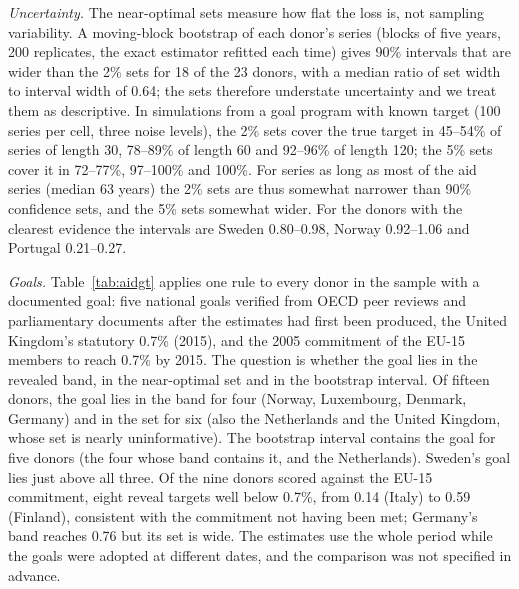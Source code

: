 \documentclass[11pt,a4paper]{article}
\theoremstyle{remark}\newtheorem{remark}{Remark}
\begin{document}
\emph{Uncertainty.} The near-optimal sets measure how flat the loss is, not sampling variability. A moving-block bootstrap of each donor's series (blocks of five years, 200 replicates, the exact estimator refitted each time) gives 90\% intervals that are wider than the 2\% sets for 18 of the 23 donors, with a median ratio of set width to interval width of 0.64; the sets therefore understate uncertainty and we treat them as descriptive. In simulations from a goal program with known target (100 series per cell, three noise levels), the 2\% sets cover the true target in 45--54\% of series of length 30, 78--89\% of length 60 and 92--96\% of length 120; the 5\% sets cover it in 72--77\%, 97--100\% and 100\%. For series as long as most of the aid series (median 63 years) the 2\% sets are thus somewhat narrower than 90\% confidence sets, and the 5\% sets somewhat wider. For the donors with the clearest evidence the intervals are Sweden 0.80--0.98, Norway 0.92--1.06 and Portugal 0.21--0.27.

\emph{Goals.} Table~\ref{tab:aidgt} applies one rule to every donor in the sample with a documented goal: five national goals verified from OECD peer reviews and parliamentary documents after the estimates had first been produced, the United Kingdom's statutory 0.7\% (2015), and the 2005 commitment of the EU-15 members to reach 0.7\% by 2015. The question is whether the goal lies in the revealed band, in the near-optimal set and in the bootstrap interval. Of fifteen donors, the goal lies in the band for four (Norway, Luxembourg, Denmark, Germany) and in the set for six (also the Netherlands and the United Kingdom, whose set is nearly uninformative). The bootstrap interval contains the goal for five donors (the four whose band contains it, and the Netherlands). Sweden's goal lies just above all three. Of the nine donors scored against the EU-15 commitment, eight reveal targets well below 0.7\%, from 0.14 (Italy) to 0.59 (Finland), consistent with the commitment not having been met; Germany's band reaches 0.76 but its set is wide. The estimates use the whole period while the goals were adopted at different dates, and the comparison was not specified in advance.
\end{document}
